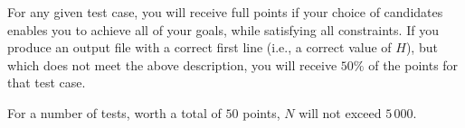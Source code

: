 For any given test case, you will receive full points if your choice of candidates enables you to achieve all of your goals, while satisfying all constraints. If you produce an output file with a correct first line (i.e., a correct value of $H$), but which does not meet the above description, you will receive $50\%$ of the points for that test case. 

For a number of tests, worth a total of $50$ points, $N$ will not exceed $5\,000$. 